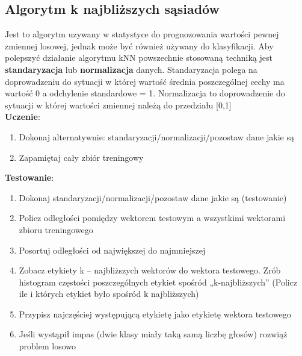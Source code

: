 \subsection{Algorytm k najbliższych sąsiadów}
Jest to algorytm uzywany w statystyce do prognozowania wartości pewnej zmiennej losowej, jednak może być również używany do klasyfikacji. Aby polepszyć działanie algorytmu kNN powszechnie stosowaną techniką jest \textbf{standaryzacja} lub \textbf{normalizacja} danych. Standaryzacja polega na doprowadzeniu do sytuacji w której wartość średnia poszczególnej cechy ma wartość 0 a odchylenie standardowe = 1. Normalizacja to  doprowadzenie do sytuacji w której wartości zmiennej należą do przedziału [0,1]
\newline \\
\textbf{Uczenie}:
\begin{enumerate}
  \item Dokonaj alternatywnie: standaryzacji/normalizacji/pozostaw dane jakie są
  \item Zapamiętaj cały zbiór treningowy
\end{enumerate}
\textbf{Testowanie}:
\begin{enumerate}
  \item Dokonaj standaryzacji/normalizacji/pozostaw dane jakie są (testowanie)
  \item Policz odległości pomiędzy wektorem testowym a wszystkimi wektorami zbioru treningowego
  \item Posortuj odległości od największej do najmniejszej
  \item Zobacz etykiety  k – najbliższych wektorów do wektora testowego.  Zrób histogram częstości poszczególnych etykiet spośród „k-najbliższych” (Policz ile i których etykiet było spośród k najbliższych)
  \item Przypisz najczęściej występującą etykietę jako etykietę wektora testowego 
  \item Jeśli wystąpił impas (dwie klasy miały taką samą liczbę głosów) rozwiąż problem losowo
\end{enumerate}
\pagebreak[4]
